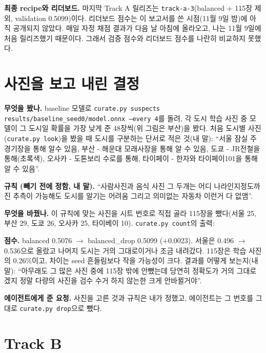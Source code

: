\documentclass[11pt]{article}
\begin{document}
\textbf{최종 recipe와 리더보드.} 마지막 Track A 릴리즈는 \texttt{track-a-3}(balanced + 115장 제외, validation 0.5099)이다.
리더보드 점수는 이 보고서를 쓴 시점(11월 9일 밤)에 아직 공개되지 않았다. 매일 자정 채점 결과가 다음 날 아침에 올라오고,
나는 11월 9일에 처음 릴리즈했기 때문이다. 그래서 검증 점수와 리더보드 점수를 나란히 비교하지 못했다.

\section*{사진을 보고 내린 결정}


\textbf{무엇을 봤나.} baseline 모델로 \texttt{curate.py suspects results/baseline\_seed0/model.onnx --every 4}를 돌려,
각 도시 학습 사진 중 모델이 그 도시일 확률을 가장 낮게 준 48장씩(위 그림은 부산)을 봤다.
처음 도시별 사진(\texttt{curate.py look})을 봤을 때 도시를 구분하는 단서로 적은 것(내 말):
``서울 잠실 주경기장을 통해 알수 있음, 부산 - 해운대 모래사장을 통해 알 수 있음, 도쿄 - JR전철을 통해(초록색), 오사카 - 도톤보리 수로를 통해, 타이페이 - 한자와 타이페이101을 통해 알 수 있음''.

\textbf{규칙 (빼기 전에 정함, 내 말).} ``사람사진과 음식 사진 그 두개는 어디 나라인지정도까진 추측이 가능해도 도시를 알기는 어려움 그리고 의미없는 자동차 이런거 다 없앰''.

\textbf{무엇을 바꿨나.} 이 규칙에 맞는 사진을 시트 번호로 직접 골라 115장을 뺐다(서울 25, 부산 29, 도쿄 26, 오사카 25, 타이베이 10).
\texttt{curate.py count}의 출력:

\textbf{점수.} balanced 0.5076 $\to$ balanced\_drop 0.5099 (+0.0023). 서울은 0.496 $\to$ 0.536으로 올랐고 나머지 도시는 거의 그대로이거나 조금 내려갔다.
115장은 학습 사진의 0.26\%이고, 차이는 seed 흔들림보다 작을 가능성이 크다. 결과를 어떻게 보는지(내 말):
``아무래도 그 많은 사진 중에 115장 밖에 안뺐는데 당연히 정확도가 거의 그대로겠지 정말 다량의 사진을 검수 수거 하지 않는한 크게 안바뀔거야''.

\textbf{에이전트에게 준 요청.} 사진을 고른 것과 규칙은 내가 정했고, 에이전트는 그 번호를 그대로 \texttt{curate.py drop}으로 뺐다.

\section*{Track B}
\end{document}
